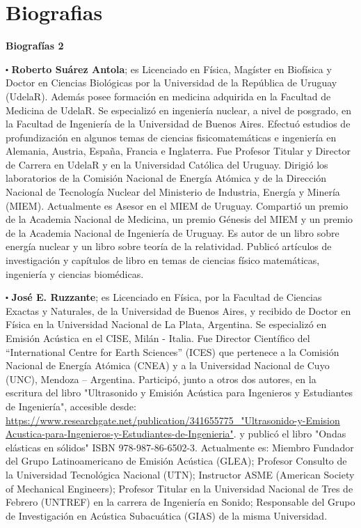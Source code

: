 

\chapter*{Biografias} %



\textbf{\huge{Biografías 2}}

$\centerdot$ \textbf{Roberto Suárez Antola}; es Licenciado en Física, Magíster en Biofísica y Doctor en Ciencias Biológicas por la Universidad de la República de Uruguay (UdelaR).  Además posee formación en medicina adquirida en la Facultad de Medicina de UdelaR. Se especializó en ingeniería nuclear, a nivel de posgrado, en la Facultad de Ingeniería de la Universidad de Buenos Aires. Efectuó estudios de profundización en algunos temas de ciencias fisicomatemáticas e ingeniería en Alemania, Austria, España, Francia e Inglaterra.
Fue Profesor Titular y Director de Carrera en UdelaR y en la Universidad Católica del Uruguay. Dirigió los laboratorios de la Comisión Nacional de Energía Atómica y de la Dirección Nacional de Tecnología Nuclear del Ministerio de Industria, Energía y Minería (MIEM). Actualmente es Asesor en el MIEM de Uruguay. Compartió un premio de la Academia Nacional de Medicina, un premio Génesis del MIEM y un premio de la Academia Nacional de Ingeniería de Uruguay. Es autor de un libro sobre energía nuclear y un libro sobre teoría de la relatividad. Publicó artículos de investigación y capítulos de libro en temas de ciencias físico matemáticas, ingeniería y ciencias biomédicas.


$\centerdot$ \textbf{José E. Ruzzante}; es Licenciado en Física, por la Facultad de Ciencias Exactas y Naturales, de la Universidad de Buenos Aires, y recibido de Doctor en Física en la Universidad Nacional de La Plata, Argentina. Se especializó en Emisión Acústica en el CISE, Milán - Italia. Fue Director Científico del “International Centre for Earth Sciences” (ICES) que pertenece a la Comisión Nacional de Energía Atómica (CNEA) y a la Universidad Nacional de Cuyo (UNC), Mendoza – Argentina. Participó, junto a otros dos autores, en la escritura del libro "Ultrasonido y Emisión Acústica para Ingenieros y Estudiantes de Ingeniería", accesible desde: \url{https://www.researchgate.net/publication/341655775_"Ultrasonido-y-Emision Acustica-para-Ingenieros-y-Estudiantes-de-Ingenieria"}. y publicó el libro "Ondas elásticas en sólidos" ISBN 978-987-86-6502-3.
 Actualmente es:  Miembro Fundador del Grupo Latinoamericano de Emisión Acústica (GLEA);  Profesor Consulto de la Universidad Tecnológica Nacional (UTN);  Instructor ASME (American Society of Mechanical Engineers); Profesor Titular en la Universidad Nacional de Tres de Febrero (UNTREF) en la carrera de Ingeniería en Sonido;  Responsable del Grupo de Investigación en Acústica Subacuática (GIAS) de la misma Universidad.


